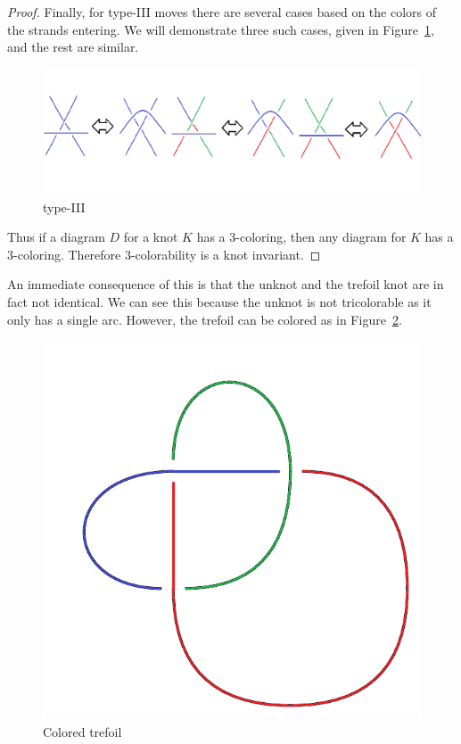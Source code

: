 \documentclass[12pt]{amsart}
\theoremstyle{definition}
\theoremstyle{remark}
\numberwithin{equation}{section}
\newcommand{\ds}{.3}
\begin{document}
\begin{proof}
  Finally, for type-III moves there are several cases based on
  the colors of the strands entering. We will demonstrate
  three such cases, given in Figure~\ref{fig:t3-c}, and the rest are similar.
  \begin{figure}
    \includegraphics[scale=\ds]{t3-c}
    \caption{type-III}
    \label{fig:t3-c}
  \end{figure}

  Thus if a diagram $D$ for a knot $K$ has a $3$-coloring, then
  any diagram for $K$ has a $3$-coloring. Therefore $3$-colorability
  is a knot invariant.
\end{proof}

An immediate consequence of this is that the unknot and the trefoil
knot are in fact not identical. We can see this because the unknot
is not tricolorable as it only has a single arc. However, the
trefoil can be colored as in Figure~\ref{fig:trefoil-c}.

\begin{figure}
  \includegraphics[scale=\ds]{trefoil-c}
  \caption{Colored trefoil}
  \label{fig:trefoil-c}
\end{figure}
\end{document}

